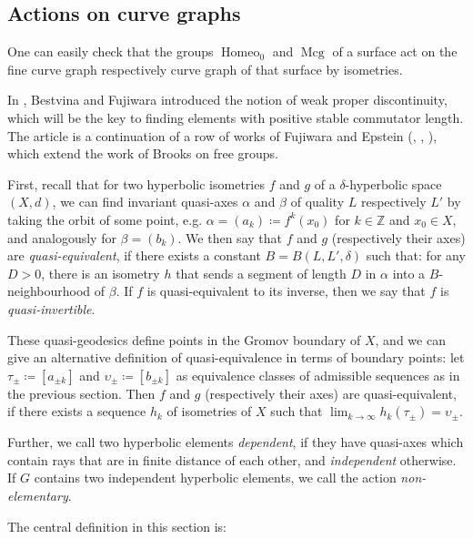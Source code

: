 \documentclass[10pt,a4paper]{amsart}
\newcommand{\ZZ}{\mathbb{Z}}
\begin{document}
\subsection{Actions on curve graphs}\label{subsec:actions-on-cg}
One can easily check that the groups $\operatorname{Homeo}_0$ and $\operatorname{Mcg}$ of a surface act on the fine curve graph respectively curve graph of that surface by isometries.

In \cite{Bestvina}, Bestvina and Fujiwara introduced the notion of weak proper discontinuity, which will be the key to finding elements with positive stable commutator length.
The article \cite{Bestvina} is a continuation of a row of works of Fujiwara and Epstein (\cite{epstein-fujiwara}, \cite{fujiwara-gromov-hyperbolic}, \cite{fujiwara-amalgamated}), which extend the work of Brooks \cite{Brooks} on free groups.

First, recall that for two hyperbolic isometries $f$ and $g$ of a $\delta$-hyperbolic space $(X,d)$, we can find invariant quasi-axes $\alpha$ and $\beta$ of quality $L$ respectively $L'$ by taking the orbit of some point, e.g. $\alpha = (a_k) \coloneqq f^k(x_0)$ for $k\in\ZZ$ and $x_0\in X$, and analogously for $\beta = (b_k)$.
We then say that $f$ and $g$ (respectively their axes) are \emph{quasi-equivalent}, if there exists a constant $B = B(L,L',\delta)$ such that:
for any $D>0$, there is an isometry $h$ that sends a segment of length $D$ in $\alpha$ into a $B$-neighbourhood of $\beta$.
If $f$ is quasi-equivalent to its inverse, then we say that $f$ is \emph{quasi-invertible}.

These quasi-geodesics define points in the Gromov boundary of $X$, and we can give an alternative definition of quasi-equivalence in terms of boundary points:
let $\tau_\pm \coloneqq [a_{\pm k}]$ and $\upsilon_\pm \coloneqq [b_{\pm k}]$ as equivalence classes of admissible sequences as in the previous section.
Then $f$ and $g$ (respectively their axes) are quasi-equivalent, if there exists a sequence $h_k$ of isometries of $X$ such that $\lim_{k\rightarrow \infty} h_k(\tau_\pm) = \upsilon_\pm$.

Further, we call two hyperbolic elements \emph{dependent}, if they have quasi-axes which contain rays that are in finite distance of each other, and \emph{independent} otherwise.
If $G$ contains two independent hyperbolic elements, we call the action \emph{non-elementary}.

The central definition in this section is:
\end{document}
